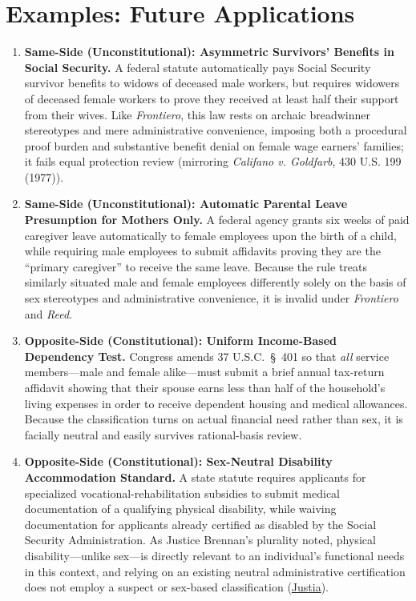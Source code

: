 \documentclass[12pt]{article}
\begin{document}
\section{Examples: Future Applications}
\begin{enumerate}
    \item \textbf{Same-Side (Unconstitutional): Asymmetric Survivors' Benefits in Social Security.} A federal statute automatically pays Social Security survivor benefits to widows of deceased male workers, but requires widowers of deceased female workers to prove they received at least half their support from their wives. Like \textit{Frontiero}, this law rests on archaic breadwinner stereotypes and mere administrative convenience, imposing both a procedural proof burden and substantive benefit denial on female wage earners' families; it fails equal protection review (mirroring \textit{Califano v. Goldfarb}, 430 U.S. 199 (1977)).
    \item \textbf{Same-Side (Unconstitutional): Automatic Parental Leave Presumption for Mothers Only.} A federal agency grants six weeks of paid caregiver leave automatically to female employees upon the birth of a child, while requiring male employees to submit affidavits proving they are the ``primary caregiver'' to receive the same leave. Because the rule treats similarly situated male and female employees differently solely on the basis of sex stereotypes and administrative convenience, it is invalid under \textit{Frontiero} and \textit{Reed}.
    \item \textbf{Opposite-Side (Constitutional): Uniform Income-Based Dependency Test.} Congress amends 37 U.S.C.~\S~401 so that \emph{all} service members---male and female alike---must submit a brief annual tax-return affidavit showing that their spouse earns less than half of the household's living expenses in order to receive dependent housing and medical allowances. Because the classification turns on actual financial need rather than sex, it is facially neutral and easily survives rational-basis review.
    \item \textbf{Opposite-Side (Constitutional): Sex-Neutral Disability Accommodation Standard.} A state statute requires applicants for specialized vocational-rehabilitation subsidies to submit medical documentation of a qualifying physical disability, while waiving documentation for applicants already certified as disabled by the Social Security Administration. As Justice Brennan's plurality noted, physical disability---unlike sex---is directly relevant to an individual's functional needs in this context, and relying on an existing neutral administrative certification does not employ a suspect or sex-based classification (\href{https://supreme.justia.com/cases/federal/us/411/677/}{Justia}).

\end{enumerate}
\end{document}
